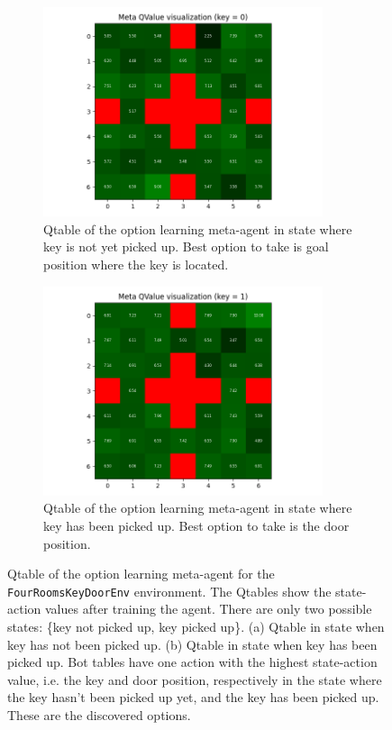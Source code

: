 \documentclass[conference]{IEEEtran}
\begin{document}
\begin{figure}[ht]
\centering
\begin{subfigure}[t]{0.45\textwidth}
\centering
\includegraphics[width=0.9\textwidth]{img/exp_option_her_qtable_small_key0.png}
\caption{Qtable of the option learning meta-agent in state where key is not yet picked up. Best option to take is goal position where the key is located.}
\label{fig:exp_option_her_qtable_small_key0}
\end{subfigure}
\hspace{1em}
\begin{subfigure}[t]{0.45\textwidth}
\centering
\includegraphics[width=0.9\textwidth]{img/exp_option_her_qtable_small_key1.png}
\caption{Qtable of the option learning meta-agent in state where key has been picked up. Best option to take is the door position.}
\label{fig:exp_option_her_qtable_small_key1}
\end{subfigure}
\caption{Qtable of the option learning meta-agent for the \texttt{FourRoomsKeyDoorEnv} environment. The Qtables show the state-action values after training the agent. There are only two possible states: \{key not picked up, key picked up\}. (a) Qtable in state when key has not been picked up. (b) Qtable in state when key has been picked up. Bot tables have one action with the highest state-action value, i.e. the key and door position, respectively in the state where the key hasn't been picked up yet, and the key has been picked up. These are the discovered options.}
\label{fig:exp_option_her_qtable_small}
\end{figure}
\end{document}
